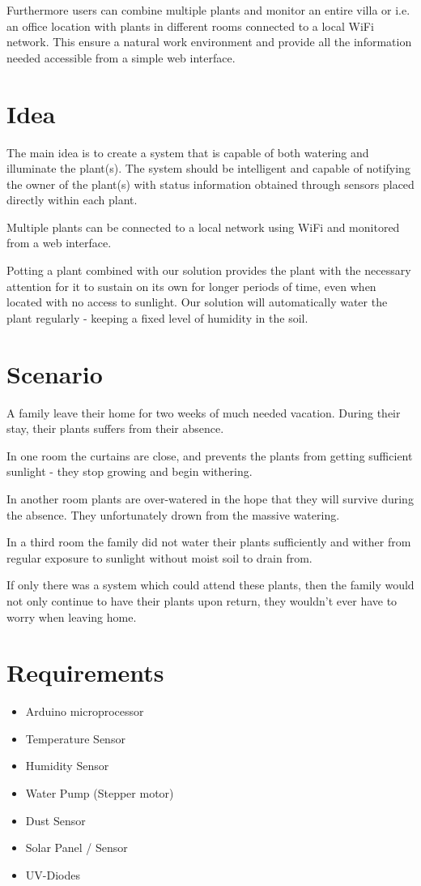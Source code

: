 \documentclass{ubicomp2012}
\begin{document}
Furthermore users can combine multiple plants and monitor an entire villa or i.e. an office location with plants in different rooms connected to a local WiFi network. This ensure a natural work environment and provide all the information needed accessible from a simple web interface.

\section{Idea}
The main idea is to create a system that is capable of both watering and illuminate the plant(s). The system should be intelligent and capable of notifying the owner of the plant(s) with status information obtained through sensors placed directly within each plant.

Multiple plants can be connected to a local network using WiFi and monitored from a web interface.

Potting a plant combined with our solution provides the plant with the necessary attention for it to sustain on its own for longer periods of time, even when located with no access to sunlight. Our solution will automatically water the plant regularly - keeping a fixed level of humidity in the soil.

\section{Scenario}
A family leave their home for two weeks of much needed vacation. During their stay, their plants suffers from their absence.

In one room the curtains are close, and prevents the plants from getting sufficient sunlight - they stop growing and begin withering.

In another room plants are over-watered in the hope that they will survive during the absence. They unfortunately drown from the massive watering.

In a third room the family did not water their plants sufficiently and wither from regular exposure to sunlight without moist soil to drain from.

If only there was a system which could attend these plants, then the family would not only continue to have their plants upon return, they wouldn't ever have to worry when leaving home.

\section{Requirements}
\begin{itemize}
\item Arduino microprocessor
\item Temperature Sensor
\item Humidity Sensor
\item Water Pump (Stepper motor)
\item Dust Sensor
\item Solar Panel / Sensor
\item UV-Diodes 
\end{itemize}
\end{document}
